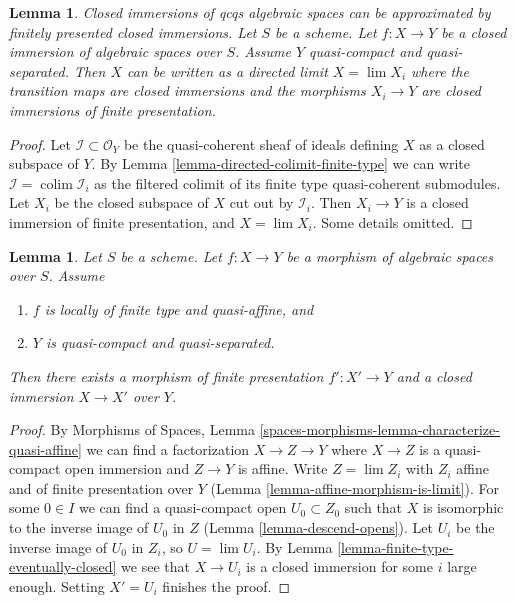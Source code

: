 \documentclass{stacks-project}
\newenvironment{slogan}{\comment}{\endcomment}
\theoremstyle{plain}
\newtheorem{lemma}[subsection]{Lemma}
\theoremstyle{definition}
\theoremstyle{remark}
\numberwithin{equation}{subsection}
\def\lim{\mathop{\mathrm{lim}}\nolimits}
\def\colim{\mathop{\mathrm{colim}}\nolimits}
\begin{document}
\begin{lemma}
\label{lemma-closed-is-limit-closed-and-finite-presentation}
\begin{slogan}
Closed immersions of qcqs algebraic spaces can be approximated
by finitely presented closed immersions.
\end{slogan}
Let $S$ be a scheme. Let $f : X \to Y$ be a closed immersion of algebraic
spaces over $S$. Assume $Y$ quasi-compact and quasi-separated.
Then $X$ can be written as a directed limit $X = \lim X_i$
where the transition maps are closed immersions and the morphisms
$X_i \to Y$ are closed immersions of finite presentation.
\end{lemma}

\begin{proof}
Let $\mathcal{I} \subset \mathcal{O}_Y$ be the quasi-coherent sheaf
of ideals defining $X$ as a closed subspace of $Y$. By
Lemma \ref{lemma-directed-colimit-finite-type}
we can write $\mathcal{I} = \colim \mathcal{I}_i$ as the
filtered colimit of its finite type quasi-coherent submodules.
Let $X_i$ be the closed subspace of $X$ cut out by $\mathcal{I}_i$.
Then $X_i \to Y$ is a closed immersion of finite presentation,
and $X = \lim X_i$. Some details omitted.
\end{proof}

\begin{lemma}
\label{lemma-quasi-affine-closed-in-finite-presentation}
Let $S$ be a scheme. Let $f : X \to Y$ be a morphism of algebraic spaces
over $S$. Assume
\begin{enumerate}
\item $f$ is locally of finite type and quasi-affine, and
\item $Y$ is quasi-compact and quasi-separated.
\end{enumerate}
Then there exists a morphism of finite presentation
$f' : X' \to Y$ and a closed immersion $X \to X'$ over $Y$.
\end{lemma}

\begin{proof}
By Morphisms of Spaces, Lemma
\ref{spaces-morphisms-lemma-characterize-quasi-affine}
we can find a factorization $X \to Z \to Y$ where
$X \to Z$ is a quasi-compact open immersion and
$Z \to Y$ is affine. Write $Z = \lim Z_i$ with $Z_i$ affine and
of finite presentation over $Y$ (Lemma \ref{lemma-affine-morphism-is-limit}).
For some $0 \in I$ we can find a quasi-compact open $U_0 \subset Z_0$
such that $X$ is isomorphic to the inverse image of $U_0$ in $Z$
(Lemma \ref{lemma-descend-opens}). Let $U_i$ be the inverse image of
$U_0$ in $Z_i$, so $U = \lim U_i$. By
Lemma \ref{lemma-finite-type-eventually-closed}
we see that $X \to U_i$ is a closed immersion for some $i$ large enough.
Setting $X' = U_i$ finishes the proof.
\end{proof}
\end{document}
